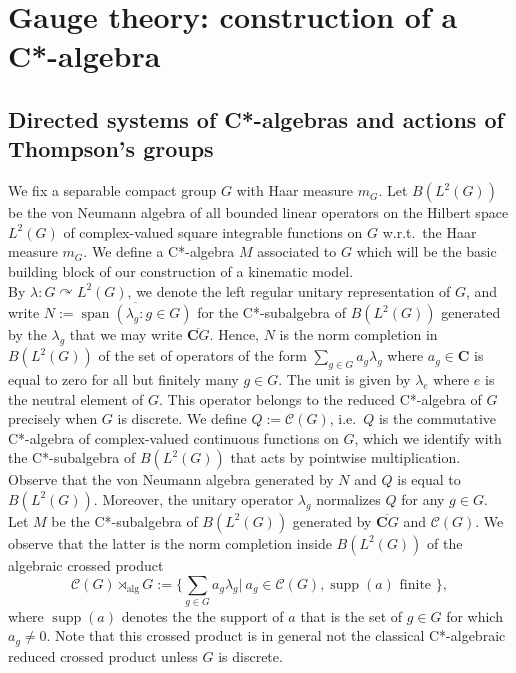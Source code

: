 \documentclass[a4paper,12pt]{amsart}
\numberwithin{equation}{section}
\theoremstyle{definition}
\newcommand{\act}{\curvearrowright}
\DeclareMathOperator{\alg}{alg}
\newcommand{\scrC}{\mathscr C}
\newcommand{\C}{\mathbf C}
\newcommand{\la}{\lambda}
\DeclareMathOperator{\supp}{supp}
\DeclareMathOperator{\Span}{span}
\begin{document}
\section{Gauge theory: construction of a C*-algebra}\label{sec:Calg}

\subsection{Directed systems of C*-algebras and actions of Thompson's groups}

We fix a separable compact group $G$ with Haar measure $m_G.$
Let $B(L^2(G))$ be the von Neumann algebra of all bounded linear operators on the Hilbert space $L^2(G)$ of complex-valued square integrable functions on $G$ {w.r.t.~the Haar measure $m_G$.}
{We define a C*-algebra $M$ associated to $G$ which will be the basic building block of our construction of a kinematic model.}\\
By $\la:G\act L^2(G)$, we denote the left regular unitary representation of $G$, and write $N:=\overline{\Span(\la_g: g\in G ) }$ for the C*-subalgebra of $B(L^2(G))$ generated by the $\la_g$ that we may write $\overline{\C G}.$
{Hence, $N$ is the norm completion in $B(L^2(G))$ of the set of operators of the form $\sum_{g\in G} a_g\la_g$ where $a_g\in\C$ is equal to zero for all but finitely many $g\in G$.}
{The unit is given by $\la_e$ where $e$ is the neutral element of $G$. This operator belongs to the reduced C*-algebra of $G$ precisely when $G$ is discrete.}
We define $Q:=\scrC(G)$, i.e.~$Q$ is the commutative C*-algebra of complex-valued continuous functions on $G$, which we identify with the C*-subalgebra of $B(L^2(G))$ that acts by pointwise multiplication.
Observe that the von Neumann algebra generated by $N$ and $Q$ is equal to $B(L^2(G))$.
Moreover, the unitary operator $\la_g$ normalizes $Q$ for any $g\in G.$
Let $M$ be the C*-subalgebra of $B(L^2(G))$ generated by $\overline{\C G}$ and $\scrC(G)$.
We observe that the latter {is the norm completion inside $B(L^2(G))$ of} the algebraic crossed product 
$$\scrC(G)\rtimes_{\alg} G:= \{\sum_{g\in G} a_g \la_g \vert \ a_g \in \scrC(G), \supp(a) \text{ finite } \},$$ 
where $\supp(a)$ denotes the {the support of $a$} that is the set of $g\in G$ for which $a_g\neq 0.$
{Note that} this crossed product is in general not the classical C*-algebraic reduced crossed product unless $G$ is discrete.
\end{document}
